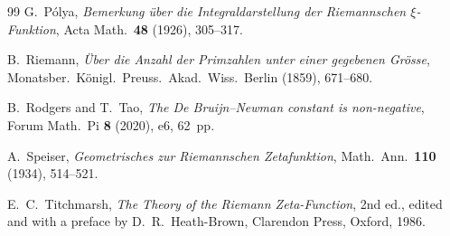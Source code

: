 \documentclass[11pt,reqno]{amsart}
\theoremstyle{definition}
\theoremstyle{remark}
\numberwithin{equation}{section}
\begin{document}
\begin{thebibliography}{99}
G.~P\'{o}lya, \emph{Bemerkung \"{u}ber die Integraldarstellung der Riemannschen $\xi$-Funktion}, Acta Math.\ \textbf{48} (1926), 305--317.

B.~Riemann, \emph{\"{U}ber die Anzahl der Primzahlen unter einer gegebenen Gr\"{o}sse}, Monatsber.\ K\"{o}nigl.\ Preuss.\ Akad.\ Wiss.\ Berlin (1859), 671--680.

B.~Rodgers and T.~Tao, \emph{The De Bruijn--Newman constant is non-negative}, Forum Math.\ Pi \textbf{8} (2020), e6, 62~pp.

A.~Speiser, \emph{Geometrisches zur Riemannschen Zetafunktion}, Math.\ Ann.\ \textbf{110} (1934), 514--521.

E.~C.~Titchmarsh, \emph{The Theory of the Riemann Zeta-Function}, 2nd ed., edited and with a preface by D.~R.~Heath-Brown, Clarendon Press, Oxford, 1986.

\end{thebibliography}
\end{document}
